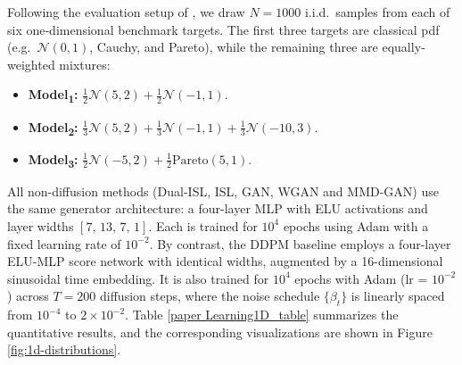 \documentclass{article}
\begin{document}
Following the evaluation setup of \cite{zaheer2017gan,de2024training}, we draw \(N=1000\) i.i.d.\ samples from each of six one‐dimensional benchmark targets. The first three targets are classical pdf (e.g.\ \(\mathcal{N}(0,1)\), Cauchy, and Pareto), while the remaining three are equally‐weighted mixtures:
\begin{itemize}
  \item \textbf{Model\textsubscript{1}:} \(\tfrac12\mathcal{N}(5,2) + \tfrac12\mathcal{N}(-1,1)\).
  \item \textbf{Model\textsubscript{2}:} \(\tfrac13\mathcal{N}(5,2) + \tfrac13\mathcal{N}(-1,1) + \tfrac13\mathcal{N}(-10,3)\).
  \item \textbf{Model\textsubscript{3}:} \(\tfrac12\mathcal{N}(-5,2) + \tfrac12\mathrm{Pareto}(5,1)\).
\end{itemize}

All non-diffusion methods (Dual-ISL, ISL, GAN, WGAN and MMD-GAN) use the same generator architecture: a four-layer MLP with ELU activations and layer widths $[7,\,13,\,7,\,1]$. Each is trained for $10^4$ epochs using Adam with a fixed learning rate of $10^{-2}$. By contrast, the DDPM baseline employs a four-layer ELU-MLP score network with identical widths, augmented by a 16-dimensional sinusoidal time embedding. It is also trained for $10^4$ epochs with Adam (lr = $10^{-2}$) across $T=200$ diffusion steps, where the noise schedule $\{\beta_t\}$ is linearly spaced from $10^{-4}$ to $2\times10^{-2}$. Table \ref{paper Learning1D_table} summarizes the quantitative results, and the corresponding visualizations are shown in Figure \ref{fig:1d-distributions}.
\end{document}
